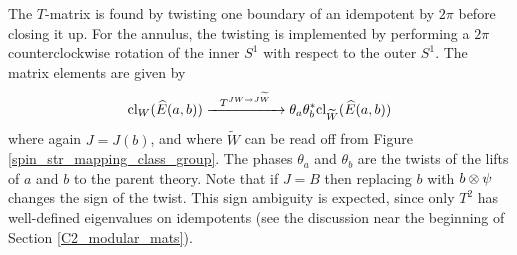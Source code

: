 The $T$-matrix is found by twisting one boundary of an idempotent by $2\pi$ before closing it up. 
For the annulus, the twisting is implemented by performing a $2\pi$ counterclockwise rotation of the inner $S^1$ with respect to the outer $S^1$.
The matrix elements are given by
\begin{align}
\text{cl}_W(\widehat{E}(a,b)) \xrightarrow{\; \; \; T^{JW \rightarrow J\widetilde{W}}\;\;\; } \theta_a \theta_b^* \text{cl}_{\widetilde{W}}(\widehat{E}(a,b))
\end{align}
where again $J = J(b)$, and where $\widetilde{W}$ can be read off from Figure \ref{spin_str_mapping_class_group}.
The phases $\theta_a$ and $\theta_b$ are the twists of the lifts of $a$ and $b$ to the parent theory.
Note that if $J = B$ then replacing $b$ with $b\otimes \psi$ changes the sign of the twist.
This sign ambiguity is expected, since only $T^2$ has well-defined eigenvalues 
on idempotents (see the discussion near the beginning of Section \ref{C2_modular_mats}). 


